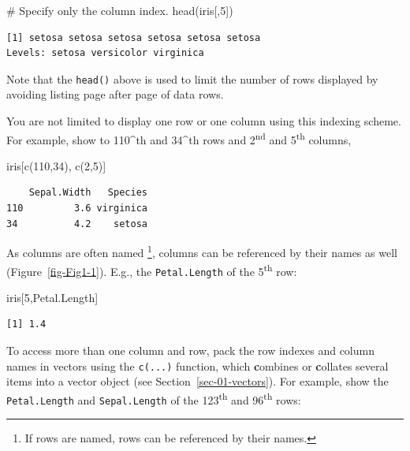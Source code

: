 \documentclass[
  letterpaper,
  DIV=11,
  numbers=noendperiod]{scrreprt}
\newenvironment{Shaded}{\begin{snugshade}}{\end{snugshade}}
\newcommand{\CommentTok}[1]{\textcolor[rgb]{0.37,0.37,0.37}{#1}}
\newcommand{\DecValTok}[1]{\textcolor[rgb]{0.68,0.00,0.00}{#1}}
\newcommand{\FunctionTok}[1]{\textcolor[rgb]{0.28,0.35,0.67}{#1}}
\newcommand{\NormalTok}[1]{\textcolor[rgb]{0.00,0.23,0.31}{#1}}
\newcommand{\StringTok}[1]{\textcolor[rgb]{0.13,0.47,0.30}{#1}}
\begin{document}
\begin{Shaded}
\begin{Highlighting}[]
\CommentTok{\# Specify only the column index.}
\FunctionTok{head}\NormalTok{(iris[,}\DecValTok{5}\NormalTok{])}
\end{Highlighting}
\end{Shaded}

\begin{verbatim}
[1] setosa setosa setosa setosa setosa setosa
Levels: setosa versicolor virginica
\end{verbatim}

Note that the \texttt{head()} above is used to limit the number of rows
displayed by avoiding listing page after page of data rows.

You are not limited to display one row or one column using this indexing
scheme. For example, show to 110\^{}th and 34\^{}th rows and
2\textsuperscript{nd} and 5\textsuperscript{th} columns,

\begin{Shaded}
\begin{Highlighting}[]
\NormalTok{iris[}\FunctionTok{c}\NormalTok{(}\DecValTok{110}\NormalTok{,}\DecValTok{34}\NormalTok{), }\FunctionTok{c}\NormalTok{(}\DecValTok{2}\NormalTok{,}\DecValTok{5}\NormalTok{)]}
\end{Highlighting}
\end{Shaded}

\begin{verbatim}
    Sepal.Width   Species
110         3.6 virginica
34          4.2    setosa
\end{verbatim}

As columns are often named \footnote{If rows are named, rows can be
  referenced by their names.}, columns can be referenced by their names
as well (Figure~\ref{fig-Fig1-1}). E.g., the \texttt{Petal.Length} of
the 5\textsuperscript{th} row:

\begin{Shaded}
\begin{Highlighting}[]
\NormalTok{iris[}\DecValTok{5}\NormalTok{,}\StringTok{\textquotesingle{}Petal.Length\textquotesingle{}}\NormalTok{]}
\end{Highlighting}
\end{Shaded}

\begin{verbatim}
[1] 1.4
\end{verbatim}

To access more than one column and row, pack the row indexes and column
names in vectors using the \texttt{c(...)} function, which
\textbf{c}ombines or \textbf{c}ollates several items into a vector
object (see Section~\ref{sec-01-vectors}). For example, show the
\texttt{Petal.Length} and \texttt{Sepal.Length} of the
123\textsuperscript{th} and 96\textsuperscript{th} rows:
\end{document}
